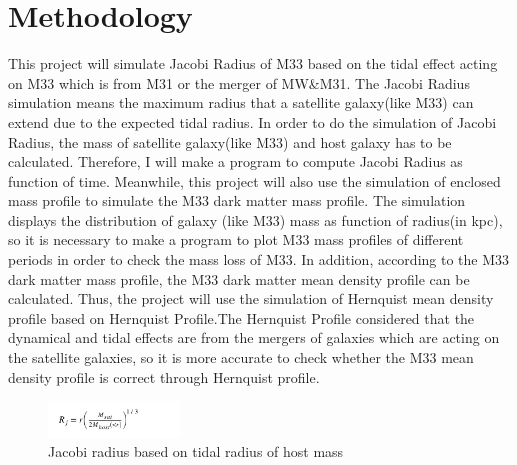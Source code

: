 \documentclass[twocolumn]{aastex63}
\begin{document}
\section{Methodology} 
\indent This project will simulate Jacobi Radius of M33 based on the tidal effect acting on M33 which is from M31 or the merger of MW&M31. The Jacobi Radius simulation means the maximum radius that a satellite galaxy(like M33) can extend due to the expected tidal radius. In order to do the simulation of Jacobi Radius, the mass of satellite galaxy(like M33) and host galaxy has to be calculated. Therefore, I will make a program to compute Jacobi Radius as function of time. Meanwhile, this project will also use the simulation of enclosed mass profile to simulate the M33 dark matter mass profile. The simulation displays the distribution of galaxy (like M33) mass as function of radius(in kpc), so it is necessary to make a program to plot M33 mass profiles of different periods in order to check the mass loss of M33. In addition, according to the M33 dark matter mass profile, the M33 dark matter mean density profile can be calculated. Thus, the project will use the simulation of Hernquist mean density profile based on Hernquist Profile.The Hernquist Profile considered that the dynamical and tidal effects are from the mergers of galaxies which are acting on the satellite galaxies, so it is more accurate to check whether the M33 mean density profile is correct through Hernquist profile. 
\begin{figure}[H]
    \centering
    \includegraphics[width=3.5cm]{JacobiRadius.png}
    \caption{Jacobi radius based on tidal radius of host mass}
\end{figure}
\end{document}
